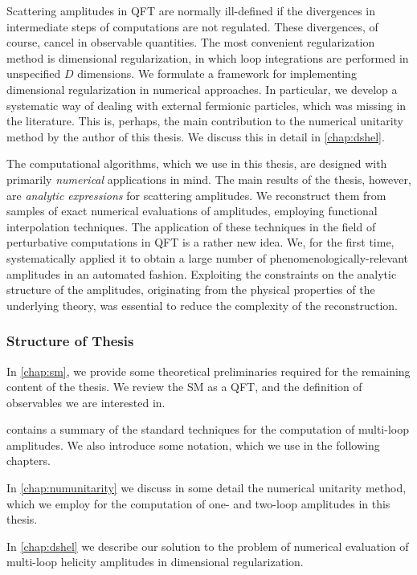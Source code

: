 Scattering amplitudes in QFT are normally ill-defined if the divergences
in intermediate steps of computations are not regulated.
These divergences, of course, cancel in observable quantities.
The most convenient regularization method is dimensional regularization,
in which loop integrations are performed in unspecified $D$ dimensions.
We formulate a framework for implementing dimensional regularization in numerical approaches.
In particular, we develop a systematic way of dealing with external fermionic particles,
which was missing in the literature.
This is, perhaps, the main contribution to the numerical unitarity method by the author of this thesis.
We discuss this in detail in \cref{chap:dshel}.

The computational algorithms, which we use in this thesis, are designed with primarily \emph{numerical} applications in mind.
The main results of the thesis, however, are \emph{analytic expressions} for scattering amplitudes.
We reconstruct them from samples of exact numerical evaluations of amplitudes,
employing functional interpolation techniques.
The application of these techniques in the field of perturbative computations in QFT is a rather new idea.
We, for the first time, systematically applied it to obtain a large number of phenomenologically-relevant amplitudes in an automated fashion. 
Exploiting the constraints on the analytic structure of the amplitudes, originating
from the physical properties of the underlying theory, was essential to reduce the complexity of the reconstruction.

\subsubsection{Structure of Thesis}

In \cref{chap:sm}, we provide some theoretical preliminaries required for the remaining 
content of the thesis.
We review the SM as a QFT, and  the definition of observables we are interested in.

 contains a summary of the standard techniques for the computation of multi-loop amplitudes.
We also introduce some notation, which we use in the following chapters.

In \cref{chap:numunitarity} we discuss in some detail the numerical unitarity method, which we employ for the computation
of one- and two-loop amplitudes in this thesis.

In \cref{chap:dshel} we describe our solution to the problem of numerical evaluation of multi-loop helicity amplitudes in dimensional regularization.

